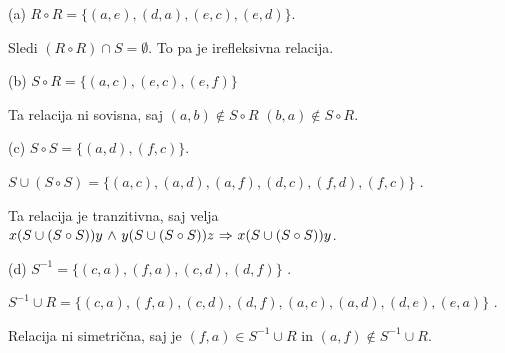 \begin{answer}{3.7}

(a)
$R\circ R = \{(a,e), (d,a), (e,c), (e,d)\}$.

Sledi
$(R\circ R)\cap S = \emptyset$. To pa je irefleksivna relacija.

(b) $S\circ R = \{(a,c), (e,c), (e,f)\}$

Ta relacija ni sovisna, saj $(a,b)\not\in S\circ R$
$(b,a)\not\in S\circ R$.

(c)
$S\circ S = \{(a,d), (f,c)\}$.

$S\cup (S\circ S)= \{(a, c), (a,d), (a, f), (d, c), (f, d), (f,c)\}$ .

Ta relacija je tranzitivna, saj velja $x(S\cup (S\circ S))y{~\wedge~}
y(S\cup (S\circ S))z{~\Rightarrow~} x(S\cup (S\circ S))y$.

(d)
$S^{-1} = \{(c, a), (f, a), (c, d), (d, f)\}$ .

$S^{-1}\cup R = \{(c, a), (f, a), (c, d), (d, f),
(a, c), (a, d), (d, e), (e, a)\}$ .

Relacija ni simetrična, saj je $(f,a)\in S^{-1}\cup R$ in $(a,f)\not\in S^{-1}\cup R$.
\end{answer}
